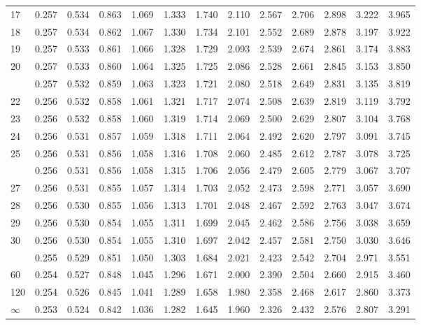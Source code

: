 \documentclass[]{article}
\begin{document}
\begin{table}[H]
\begin{tabular}{lrrrrrrrrrrrr}
17 & 0.257 & 0.534 & 0.863 & 1.069 & 1.333 & 1.740 & 2.110 & 2.567 & 2.706 & 2.898 & 3.222 & 3.965\\
18 & 0.257 & 0.534 & 0.862 & 1.067 & 1.330 & 1.734 & 2.101 & 2.552 & 2.689 & 2.878 & 3.197 & 3.922\\
19 & 0.257 & 0.533 & 0.861 & 1.066 & 1.328 & 1.729 & 2.093 & 2.539 & 2.674 & 2.861 & 3.174 & 3.883\\
20 & 0.257 & 0.533 & 0.860 & 1.064 & 1.325 & 1.725 & 2.086 & 2.528 & 2.661 & 2.845 & 3.153 & 3.850\\
\addlinespace
21 & 0.257 & 0.532 & 0.859 & 1.063 & 1.323 & 1.721 & 2.080 & 2.518 & 2.649 & 2.831 & 3.135 & 3.819\\
22 & 0.256 & 0.532 & 0.858 & 1.061 & 1.321 & 1.717 & 2.074 & 2.508 & 2.639 & 2.819 & 3.119 & 3.792\\
23 & 0.256 & 0.532 & 0.858 & 1.060 & 1.319 & 1.714 & 2.069 & 2.500 & 2.629 & 2.807 & 3.104 & 3.768\\
24 & 0.256 & 0.531 & 0.857 & 1.059 & 1.318 & 1.711 & 2.064 & 2.492 & 2.620 & 2.797 & 3.091 & 3.745\\
25 & 0.256 & 0.531 & 0.856 & 1.058 & 1.316 & 1.708 & 2.060 & 2.485 & 2.612 & 2.787 & 3.078 & 3.725\\
\addlinespace
26 & 0.256 & 0.531 & 0.856 & 1.058 & 1.315 & 1.706 & 2.056 & 2.479 & 2.605 & 2.779 & 3.067 & 3.707\\
27 & 0.256 & 0.531 & 0.855 & 1.057 & 1.314 & 1.703 & 2.052 & 2.473 & 2.598 & 2.771 & 3.057 & 3.690\\
28 & 0.256 & 0.530 & 0.855 & 1.056 & 1.313 & 1.701 & 2.048 & 2.467 & 2.592 & 2.763 & 3.047 & 3.674\\
29 & 0.256 & 0.530 & 0.854 & 1.055 & 1.311 & 1.699 & 2.045 & 2.462 & 2.586 & 2.756 & 3.038 & 3.659\\
30 & 0.256 & 0.530 & 0.854 & 1.055 & 1.310 & 1.697 & 2.042 & 2.457 & 2.581 & 2.750 & 3.030 & 3.646\\
\addlinespace
40 & 0.255 & 0.529 & 0.851 & 1.050 & 1.303 & 1.684 & 2.021 & 2.423 & 2.542 & 2.704 & 2.971 & 3.551\\
60 & 0.254 & 0.527 & 0.848 & 1.045 & 1.296 & 1.671 & 2.000 & 2.390 & 2.504 & 2.660 & 2.915 & 3.460\\
120 & 0.254 & 0.526 & 0.845 & 1.041 & 1.289 & 1.658 & 1.980 & 2.358 & 2.468 & 2.617 & 2.860 & 3.373\\
$\infty$ & 0.253 & 0.524 & 0.842 & 1.036 & 1.282 & 1.645 & 1.960 & 2.326 & 2.432 & 2.576 & 2.807 & 3.291\\
\bottomrule
\end{tabular}
\end{table}
\end{document}
